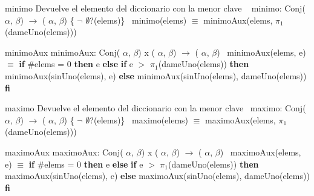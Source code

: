 \begin{DoxyParagraph}{minimo}
Devuelve el elemento del diccionario con la menor clave ~\newline
minimo\+: Conj( $\alpha$, $\beta$) $\to$ ( $\alpha$, $\beta$) \{ $\lnot$ $\emptyset$?(elems)\}~\newline
minimo(elems) $\equiv$ minimo\+Aux(elems, $\pi_1$(dame\+Uno(elems))) 
\end{DoxyParagraph}


\begin{DoxyParagraph}{minimo\+Aux}
minimo\+Aux\+: Conj( $\alpha$, $\beta$) x ( $\alpha$, $\beta$) $\to$ ( $\alpha$, $\beta$)~\newline
minimo\+Aux(elems, e) $\equiv$ {\bfseries if} \#elems = 0 {\bfseries then} e {\bfseries else} {\bfseries if} e $>$ $\pi_1$(dame\+Uno(elems)) {\bfseries then} minimo\+Aux(sin\+Uno(elems), e) {\bfseries else} minimo\+Aux(sin\+Uno(elems), dame\+Uno(elems)) {\bfseries fi} 
\end{DoxyParagraph}


\begin{DoxyParagraph}{maximo}
Devuelve el elemento del diccionario con la menor clave~\newline
maximo\+: Conj( $\alpha$, $\beta$) $\to$ ( $\alpha$, $\beta$) \{ $\lnot$ $\emptyset$?(elems)\}~\newline
maximo(elems) $\equiv$ maximo\+Aux(elems, $\pi_1$(dame\+Uno(elems))) 
\end{DoxyParagraph}


\begin{DoxyParagraph}{maximo\+Aux}
maximo\+Aux\+: Conj( $\alpha$, $\beta$) x ( $\alpha$, $\beta$) $\to$ ( $\alpha$, $\beta$)~\newline
maximo\+Aux(elems, e) $\equiv$ {\bfseries if} \#elems = 0 {\bfseries then} e {\bfseries else} {\bfseries if} e $>$ $\pi_1$(dame\+Uno(elems)) {\bfseries then} maximo\+Aux(sin\+Uno(elems), e) {\bfseries else} maximo\+Aux(sin\+Uno(elems), dame\+Uno(elems)) {\bfseries fi} 
\end{DoxyParagraph}
